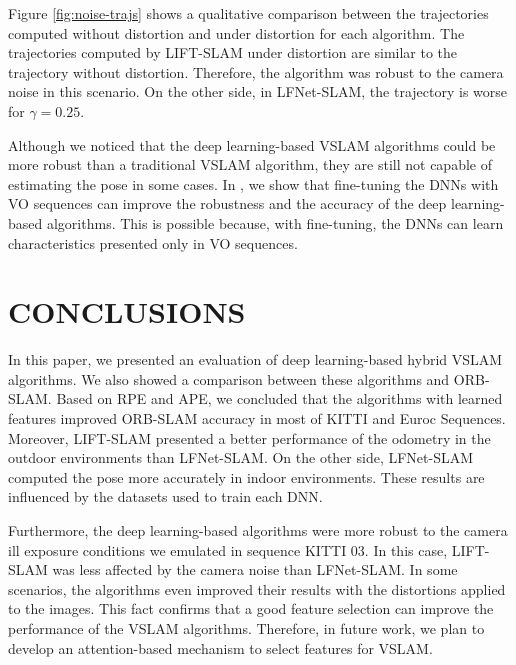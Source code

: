 \documentclass[a4paper, 10pt, conference]{ieeeconf}      %
\begin{document}
Figure \ref{fig:noise-trajs} shows a qualitative comparison between the trajectories computed without distortion and under distortion for each algorithm. The trajectories computed by LIFT-SLAM under distortion are similar to the trajectory without distortion. Therefore, the algorithm was robust to the camera noise in this scenario. On the other side, in LFNet-SLAM, the trajectory is worse for $\gamma = 0.25$.

\begin{figure*}[tb]
\centering
{}
{}
\qquad
{}
\caption{Qualitative results of the robustness tests.}
\label{fig:noise-trajs}
\end{figure*}

Although we noticed that the deep learning-based VSLAM algorithms could be more robust than a traditional VSLAM algorithm, they are still not capable of estimating the pose in some cases. In \cite{lift-slam}, we show that fine-tuning the DNNs with VO sequences can improve the robustness and the accuracy of the deep learning-based algorithms. This is possible because, with fine-tuning, the DNNs can learn characteristics presented only in VO sequences.


\section{CONCLUSIONS}

In this paper, we presented an evaluation of deep learning-based hybrid VSLAM algorithms. We also showed a comparison between these algorithms and ORB-SLAM. Based on RPE and APE, we concluded that the algorithms with learned features improved ORB-SLAM accuracy in most of KITTI and Euroc Sequences. Moreover, LIFT-SLAM presented a better performance of the odometry in the outdoor environments than LFNet-SLAM. On the other side, LFNet-SLAM computed the pose more accurately in indoor environments. These results are influenced by the datasets used to train each DNN.

Furthermore, the deep learning-based algorithms were more robust to the camera ill exposure conditions we emulated in sequence KITTI $03$. In this case, LIFT-SLAM was less affected by the camera noise than LFNet-SLAM. In some scenarios, the algorithms even improved their results with the distortions applied to the images. This fact confirms that a good feature selection can improve the performance of the VSLAM algorithms. Therefore, in future work, we plan to develop an attention-based mechanism to select features for VSLAM.
\end{document}
